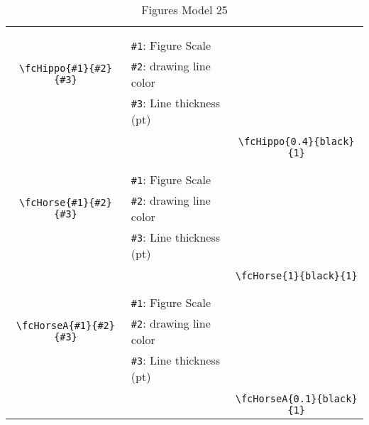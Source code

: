 \documentclass[x11names]{article}
\begin{document}
\begin{table}[H]
\begin{tabular}{|c|l|c|}
	&&\multirow{5}{*}{\fcHippo{0.4}{black}{1}}\\	&&\\	&\verb|#1|: Figure Scale &\\	\verb|\fcHippo{#1}{#2}{#3}|&	\verb|#2|: drawing line color &\\	&\verb|#3|: Line thickness (pt) &\\ &&\\&&	\verb|\fcHippo{0.4}{black}{1}|\\\hline 	
	&&\multirow{5}{*}{\fcHorse{1}{black}{1}}\\	&&\\	&\verb|#1|: Figure Scale &\\	\verb|\fcHorse{#1}{#2}{#3}|&	\verb|#2|: drawing line color &\\	&\verb|#3|: Line thickness (pt) &\\ &&\\&&	\verb|\fcHorse{1}{black}{1}|\\\hline 	
	&&\multirow{5}{*}{\fcHorseA{0.1}{black}{1}}\\	&&\\	&\verb|#1|: Figure Scale &\\	\verb|\fcHorseA{#1}{#2}{#3}|&	\verb|#2|: drawing line color &\\	&\verb|#3|: Line thickness (pt) &\\ &&\\&&	\verb|\fcHorseA{0.1}{black}{1}|\\\hline 	\hline\end{tabular}\caption{Figures Model 25}\label{tab25}\end{table}
\end{document}
